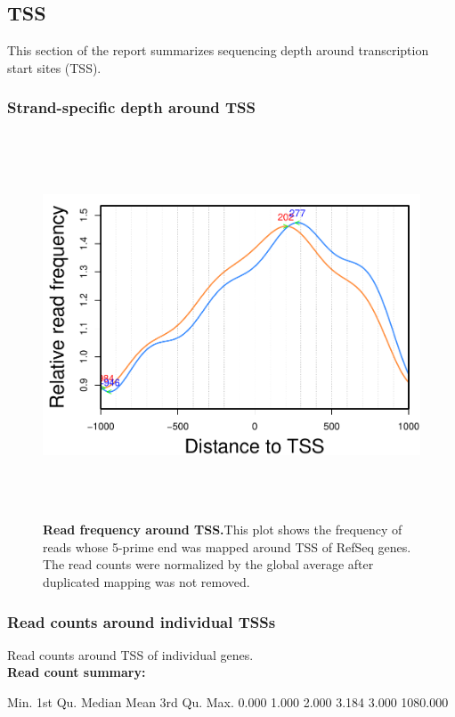 \documentclass{article}
\begin{document}
\subsection{TSS}
This section of the report summarizes sequencing depth around transcription start sites (TSS).
\subsubsection{Strand-specific depth around TSS}
\begin{center}
\begin{figure}[H]
\includegraphics[width=6.5in, height=4.5in, page=1]{bamchop-chip-tss-loc}
\caption{\textbf{Read frequency around TSS.}This plot shows the frequency of reads whose 5-prime end was mapped around TSS of RefSeq genes. The read counts were normalized by the global average after duplicated mapping was not removed.}
\end{figure}
\end{center}

\subsubsection{Read counts around individual TSSs}
Read counts around TSS of individual genes.
\vspace*{1\baselineskip}
\\{\textbf{Read count summary:}}
\begin{Schunk}
\begin{Soutput}
    Min.  1st Qu.   Median     Mean  3rd Qu.     Max. 
   0.000    1.000    2.000    3.184    3.000 1080.000 
\end{Soutput}
\end{Schunk}
\end{document}
